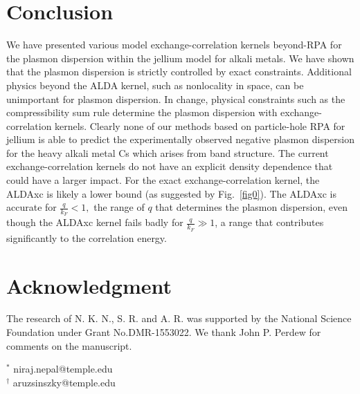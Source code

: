 \documentclass[aps,amsmath,amssymb, preprint, 12pt]{revtex4-1}
\begin{document}
\section{Conclusion}
We have presented various model exchange-correlation kernels beyond-RPA for the plasmon dispersion within the jellium model for alkali metals. We have shown that the plasmon dispersion is strictly controlled by exact constraints. Additional physics beyond the ALDA kernel, such as nonlocality in space, can be unimportant for plasmon dispersion. In change, physical constraints such as the compressibility sum rule determine the plasmon dispersion with exchange-correlation kernels. Clearly none of our methods based on particle-hole RPA for jellium is able to predict the experimentally observed negative plasmon dispersion for the heavy alkali metal Cs which arises from band structure. The current exchange-correlation kernels do not have an explicit density dependence that could have a larger impact. For the exact exchange-correlation kernel, the ALDAxc is likely a lower bound (as suggested by Fig.~\ref{fig0}). The ALDAxc is accurate for  \( \frac{q}{k_{F}}<1, \)  the range of  \( q \)  that determines the plasmon dispersion, even though the ALDAxc kernel fails badly for  \( \frac{q}{k_{F}} \gg 1 \), a range that contributes significantly to the correlation energy.



\section{Acknowledgment}
 
The research of N. K. N., S. R. and A. R. was supported by the National Science Foundation under Grant {\fontsize{10pt}{12.0pt}\selectfont No.DMR-1553022}. We thank John P. Perdew for comments on the manuscript.

\noindent$^*$ niraj.nepal@temple.edu\\
$^\dagger$ aruzsinszky@temple.edu\\

\end{document}
